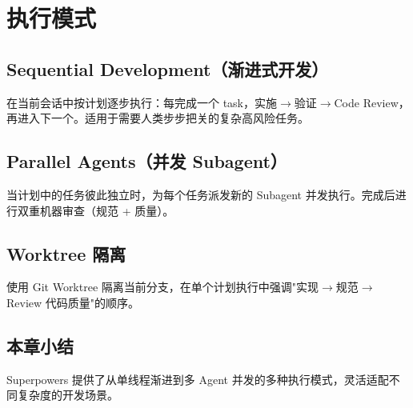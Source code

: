 \section{执行模式}

\subsection{Sequential Development（渐进式开发）}

在当前会话中按计划逐步执行：每完成一个 task，实施$\rightarrow$验证$\rightarrow$Code Review，再进入下一个。适用于需要人类步步把关的复杂高风险任务。

\subsection{Parallel Agents（并发 Subagent）}

当计划中的任务彼此独立时，为每个任务派发新的 Subagent 并发执行。完成后进行双重机器审查（规范 + 质量）。

\subsection{Worktree 隔离}

使用 Git Worktree 隔离当前分支，在单个计划执行中强调"实现$\rightarrow$规范$\rightarrow$Review 代码质量"的顺序。

\subsection{本章小结}

Superpowers 提供了从单线程渐进到多 Agent 并发的多种执行模式，灵活适配不同复杂度的开发场景。


